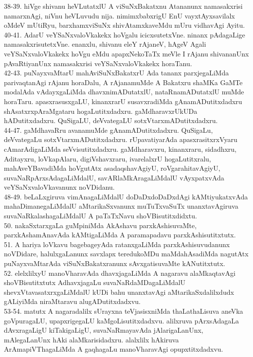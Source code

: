 \documentclass{article}
\begin{document}
38-39. hiVge shivanu heVLutatxlU A viSuNxBakatxnu Atananunx namasakxrisi namarxnAgi, niVnu heVLuvudu nija. nimimxbabxrigU EnU vayxtAyxsavilalx oMdeV mUtiRyu, barxhamxviSuNx shivAtamxkaveMdu mUru vidhavAgi Ayitu.\\
40-41. AdarU veYSaNxvaloVkakekx hoVgalu icicxsutetxVne. ninanx pAdagaLige namasakxrisutetxVne. enanxlu, shivanu eleY rAjaneV, hAgeV Agali veYSaNxvaloVkakekx hoVgu eMdu apapxNekoTaTx meVle I rAjanu shivananUnx pAvaRtiyanUnx namasakxrisi veYSaNxvaloVkakekx horaTanu.\\
42-43. puNayxvaMtarU mahAviSuNxBakatxrU Ada tananx parxjegaLiMda parivaqtanAgi rAjanu horaDalu, A rAjanamuMde A Bakatxru shaMKa GaMTe modalAda vAdayxgaLiMda dhavxnimADutatxlU, nataRnamADutatxlU muMde horaTaru. apasxrasusxgaLU, kinanxrarU susavxradiMda gAnamADutitxdadxru shAsatxrxpAraMgataru hogaLutitxdadxru. gaMdharavxrUkUDa hADutitxdadxru. QuSigaLU, deVvategaLU sotxVtarxmADutitxdadxru.\\
44-47. gaMdhavaRru avanamuMde gAnamADutitxdadxru. QuSigaLu, deVvategaLu sotxVtarxmADutitxdadxru. rUpavatiyarAda apasxrasitxrxVyaru cAmarAdigaLiMda seVvisutitxdadxru. gaMdharavxru, kinanxraru, sidadhxru, Aditayxru, loVkapAlaru, digiVshavxraru, ivarelalxrU hogaLutitxralu, mahAveYBavadiMda hoVgutAtx asadaqshavAgiyU, roVgarahitavAgiyU, suvaNaRpArxsAdagaLiMdalU, savARlaMkAragaLiMdalU vAyxpatxvAda veYSaNxvaloVkavanunx noVDidanu.\\
48-49. beLaLxgiruva vimAnagaLiMdalU doDaDxdoDaDxdAgi kAMtiyukatxvAda mahaDimanegaLiMdalU aMtarikaSxvanunx muTuTxvaSuTx unanxtavAgiruva suvaNaRkalashagaLiMdalU A paTaTxNavu shoVBisutitxdidxtu.\\
50. nakaSxtarxgaLa guMpiniMda AkAshavu parxkAshisuvaMte, parxkAshamAnavAda kAMtigaLiMda A paramapadavu parxkAshisutitxtutx.\\
51. A hariya loVkavu bagebageyAda ratanxgaLiMda parxkAshisuvudanunx noVDidare, halulxgaLanunx savxlapx teredukoMDu maMdahAsadiMda nagutAtx puNayxvaMtarAda viSuNxBakatxranunx sAvxgatisuvaMte kANutitxtutx.\\
52. elelxlilxyU manoVharavAda dhavxjagaLiMda A nagaravu alaMkaqtavAgi shoVBisutitxtutx AdhavxjagaLu suvaNaRdaMDagaLiMdalU shevxVtavasatxrxgaLiMdalU kUDi bahu unanxtavAgi aMtarikaSxdalilxdudx gALiyiMda niraMtaravu alugADutitxdadxvu.\\
53-54. matutx A nagaradalilx sUrayxna teVjasisxniMda thaLathaLisuva aneVka goVpuragaLU, upapxrigegaLU kaMgoLisutitxdadxvu. alilxruva pArxsAdagaLa dAvxragaLigU kiTakigaLigU, suvaNaRmayavAda jAlarigaLanUnx, mAlegaLanUnx hAki alaMkarisidadxru. alalxlilx hAkiruva ArAmapiVThagaLiMda A gaqhagaLu manoVharavAgi opupxtitxdadxvu.\\
\end{document}
